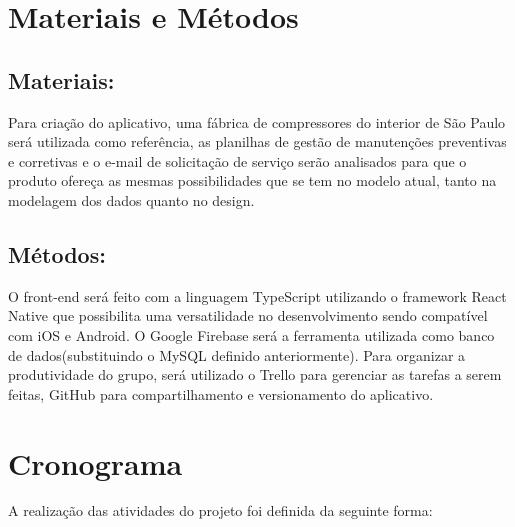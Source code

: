 \documentclass[%
  a4paper,%
  12pt,%
  english,%
  brazilian,%
]{article}
\begin{document}
\section{Materiais e Métodos}%



\subsection{Materiais:}%
Para criação do aplicativo, uma fábrica de compressores do interior de São Paulo será utilizada como referência, as planilhas de gestão de manutenções preventivas e corretivas e o e-mail de solicitação de serviço serão analisados para que o produto ofereça as mesmas possibilidades que se tem no modelo atual, tanto na modelagem dos dados quanto no design.

\subsection{Métodos:}%
O front-end será feito com a linguagem TypeScript utilizando o framework React Native que possibilita uma versatilidade no desenvolvimento sendo compatível com iOS e Android.
O Google Firebase será a ferramenta utilizada como banco de dados(substituindo o MySQL definido anteriormente). 
Para organizar a produtividade do grupo, será utilizado o Trello para gerenciar as tarefas a serem feitas, GitHub para compartilhamento e versionamento do aplicativo. 






\section{Cronograma}%
A realização das atividades do projeto foi definida da seguinte forma:
\end{document}
